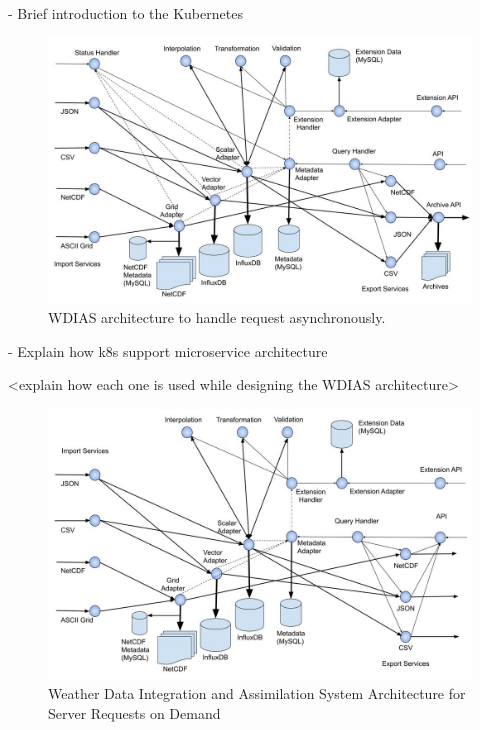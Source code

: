 - Brief introduction to the Kubernetes

\begin{figure}[htp]
    \centering
    \includegraphics[width=1\textwidth]{method/microservice/microservice_architecture-handle_on_async-v3.jpg}
    \caption{WDIAS architecture to handle request asynchronously.}
    \label{fi:wdias_micro_async}
\end{figure}


- Explain how k8s support microservice architecture

<explain how each one is used while designing the WDIAS architecture>

\begin{figure}[htp]
    \centering
    \includegraphics[width=1\textwidth]{method/microservice/microservice_architecture-handle_on_demand-v3.jpg}
    \caption{Weather Data Integration and Assimilation System Architecture for Server Requests on Demand}
    \label{fi:wdias_micro_on_demand}
\end{figure}

